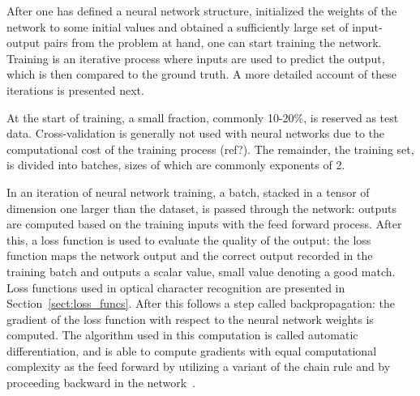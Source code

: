 \documentclass[english,twoside,openright]{UH_DS_MSc}
\begin{document}
After one has defined a neural network structure, initialized the weights of the network 
to some initial values and obtained a sufficiently large set of input-output pairs from the problem at hand,
one can start training the network. Training is an iterative process where inputs are used to 
predict the output, which is then compared to the ground truth. A more detailed account of these iterations
is presented next.

At the start of training, a small fraction, commonly 10-20\%, is reserved as test data. Cross-validation is 
generally not used with neural networks due to the computational cost of the training process (ref?). The remainder, 
the training set, is divided into batches, sizes of which are commonly exponents of 2.

In an iteration of neural network training, a batch, stacked in a tensor of dimension one larger than the dataset, 
is passed through the network: outputs are computed based on the training inputs with the feed forward process.
After this, a loss function is used to evaluate the quality of the output: the loss function maps the network output and 
the correct output recorded in the training batch and outputs a scalar value, small value denoting a good 
match. Loss functions used in optical character recognition are presented in Section~\ref{sect:loss_funcs}.
After this follows a step called backpropagation: the gradient of the loss function with respect 
to the neural network weights is computed. The algorithm used in this computation is called automatic differentiation,
and is able to compute gradients with equal computational complexity as the feed forward by utilizing 
a variant of the chain rule and by proceeding backward in the network~\cite{princebook}.
\end{document}
